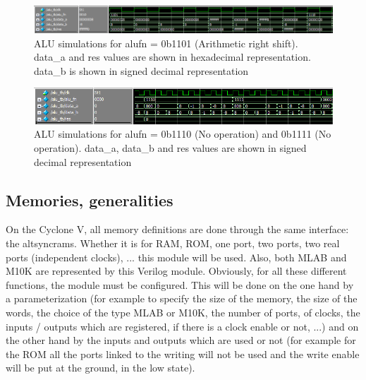 \begin{figure}[H]
    \centering
    \includegraphics[width=\linewidth]{Chapter3-CPU/res/alu_simu_3_2.PNG}
    \caption{ALU simulations for alufn = 0b1101 (Arithmetic right shift). data\_a and
    res values are shown in hexadecimal representation. data\_b is shown in signed decimal 
    representation}
    \label{fig:sim/alu_6}
\end{figure}

\begin{figure}[H]
    \centering
    \includegraphics[width=\linewidth]{Chapter3-CPU/res/alu_simu_4.PNG}
    \caption{ALU simulations for alufn = 0b1110 (No operation) and 0b1111 (No operation).
     data\_a, data\_b and res values are shown in signed decimal 
    representation}
    \label{fig:sim/alu_7}
\end{figure}

\subsection{Memories, generalities}

On the Cyclone V, all memory definitions are done through the same interface: the altsyncrams. 
Whether it is for RAM, ROM, one port, two ports, two real ports (independent clocks), ... this 
module will be used. Also, both MLAB and M10K are represented by this Verilog module. 
Obviously, for all these different functions, the module must be configured. This will be done on 
the one hand by a parameterization (for example to specify the size of the memory, the size of the 
words, the choice of the type MLAB or M10K, the number of ports, of clocks, the inputs / outputs 
which are registered, if there is a clock enable or not, ...) and on the other hand by the inputs 
and outputs which are used or not (for example for the ROM all the ports linked to the writing will 
not be used and the write enable will be put at the ground, in the low state). 

